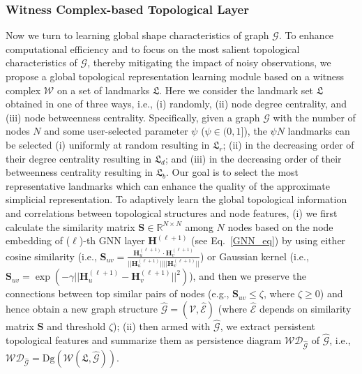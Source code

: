 \documentclass[letterpaper]{article} %
\newcommand{\YGL}[1]{{{\textcolor{blue}{\textbf{YGL:}}}{\textcolor{red}{\textbf{#1}}}}}
\begin{document}
\subsubsection{Witness Complex-based Topological Layer}
Now we turn to learning global shape characteristics of graph $\mathcal{G}$. To enhance computational efficiency and to focus on the most salient topological characteristics of $\mathcal{G}$, thereby mitigating the impact of noisy observations,
we propose a global topological representation learning module based on a witness complex $\mathcal{W}$ on a set of landmarks $\mathfrak{L}$.
Here we consider the landmark set $\mathfrak{L}$ obtained in one of three ways, i.e., (i) randomly, (ii) node degree centrality, and (iii) node betweenness centrality. Specifically, given a graph $\mathcal{G}$ with the number of nodes $N$ and some user-selected parameter $\psi$ ($\psi \in (0,1]$), the $\psi N$ landmarks can be selected (i) uniformly at random resulting in $\mathfrak{L}_r$; (ii) in the decreasing order of their degree centrality resulting in $\mathfrak{L}_d$;
and (iii) in the decreasing order of their betweenness centrality resulting in $\mathfrak{L}_b$.
Our goal is to select the most representative landmarks which can enhance the quality of the approximate simplicial representation. %
To adaptively learn the global topological information and correlations between topological structures and node features, (i) we first calculate the similarity matrix $\boldsymbol{S} \in \mathbb{R}^{N \times N}$ among $N$ nodes based on the node embedding of ($\ell$)-th GNN layer $\boldsymbol{H}^{(\ell+1)}$ (see Eq.~\ref{GNN_eq}) by using either cosine similarity (i.e., $\boldsymbol{S}_{uv} = \frac{\boldsymbol{H}_u^{(\ell+1)} \cdot \boldsymbol{H}_v^{(\ell+1)}}{||\boldsymbol{H}_u^{(\ell+1)}|| ||\boldsymbol{H}_v^{(\ell+1)}||}$) or Gaussian kernel (i.e., $\boldsymbol{S}_{uv} = \exp{(-\gamma||\boldsymbol{H}_u^{(\ell+1)} - \boldsymbol{H}_v^{(\ell+1)}||^2)}$), and then we preserve the connections between top similar pairs of nodes (e.g., $\boldsymbol{S}_{uv} \leq \zeta$, where $\zeta \geq 0$) and hence obtain a new graph structure $\mathcal{\hat{G}} = (\mathcal{V}, \mathcal{\hat{E}})$ (where $\mathcal{\hat{E}}$ depends on similarity matrix $\boldsymbol{S}$ and threshold $\zeta$); (ii) then armed with $\mathcal{\hat{G}}$, we extract persistent topological features and summarize them as persistence diagram $\mathcal{WD}_{\mathcal{\hat{G}}}$ of $\mathcal{\hat{G}}$, i.e., $\mathcal{WD}_{\mathcal{\hat{G}}} = \text{Dg}(\mathcal{W}(\mathfrak{L}, \mathcal{\hat{G}}))$.
\end{document}
